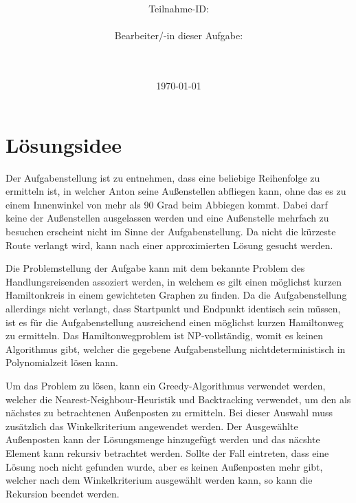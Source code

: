 \documentclass[a4paper,10pt,ngerman]{scrartcl}
\title{\textbf{\Huge\Aufgabe}}
\author{\LARGE Teilnahme-ID: \LARGE \TeilnahmeId \\\\
\LARGE Bearbeiter/-in dieser Aufgabe: \\
\LARGE \Name\\\\}
\date{\LARGE\today}
\begin{document}
    \maketitle
    \tableofcontents
    \vspace{0.5cm}
    \newpage


    \section{Lösungsidee}\label{sec:losungsidee}

    Der Aufgabenstellung ist zu entnehmen, dass eine beliebige Reihenfolge zu ermitteln ist,
    in welcher Anton seine Außenstellen abfliegen kann,
    ohne das es zu einem Innenwinkel von mehr als 90 Grad beim Abbiegen kommt.
    Dabei darf keine der Außenstellen ausgelassen werden
    und eine Außenstelle mehrfach zu besuchen erscheint nicht im Sinne der Aufgabenstellung.
    Da nicht die kürzeste Route verlangt wird, kann nach einer approximierten Lösung gesucht werden.

    Die Problemstellung der Aufgabe kann mit dem bekannte Problem des Handlungsreisenden assoziert werden,
    in welchem es gilt einen möglichst kurzen Hamiltonkreis in einem gewichteten Graphen zu finden.
    Da die Aufgabenstellung allerdings nicht verlangt, dass Startpunkt und Endpunkt identisch sein müssen,
    ist es für die Aufgabenstellung ausreichend einen möglichst kurzen Hamiltonweg zu ermitteln.
    Das Hamiltonwegproblem ist NP-vollständig, womit es keinen Algorithmus gibt,
    welcher die gegebene Aufgabenstellung nichtdeterministisch in Polynomialzeit lösen kann.

    Um das Problem zu lösen, kann ein Greedy-Algorithmus verwendet werden,
    welcher die Nearest-Neighbour-Heuristik und Backtracking verwendet,
    um den als nächstes zu betrachtenen Außenposten zu ermitteln.
    Bei dieser Auswahl muss zusätzlich das Winkelkriterium angewendet werden.
    Der Ausgewählte Außenposten kann der Lösungsmenge hinzugefügt werden
    und das näcshte Element kann rekursiv betrachtet werden.
    Sollte der Fall eintreten, dass eine Lösung noch nicht gefunden wurde, aber es keinen Außenposten mehr gibt,
    welcher nach dem Winkelkriterium ausgewählt werden kann, so kann die Rekursion beendet werden.
\end{document}
